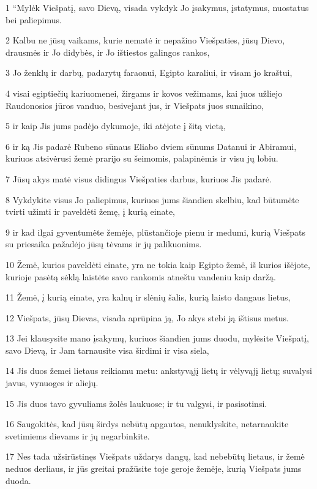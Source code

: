 \par 1 “Mylėk Viešpatį, savo Dievą, visada vykdyk Jo įsakymus, įstatymus, nuostatus bei paliepimus. 
\par 2 Kalbu ne jūsų vaikams, kurie nematė ir nepažino Viešpaties, jūsų Dievo, drausmės ir Jo didybės, ir Jo ištiestos galingos rankos, 
\par 3 Jo ženklų ir darbų, padarytų faraonui, Egipto karaliui, ir visam jo kraštui, 
\par 4 visai egiptiečių kariuomenei, žirgams ir kovos vežimams, kai juos užliejo Raudonosios jūros vanduo, besivejant jus, ir Viešpats juos sunaikino, 
\par 5 ir kaip Jis jums padėjo dykumoje, iki atėjote į šitą vietą, 
\par 6 ir ką Jis padarė Rubeno sūnaus Eliabo dviem sūnums Datanui ir Abiramui, kuriuos atsivėrusi žemė prarijo su šeimomis, palapinėmis ir visu jų lobiu. 
\par 7 Jūsų akys matė visus didingus Viešpaties darbus, kuriuos Jis padarė. 
\par 8 Vykdykite visus Jo paliepimus, kuriuos jums šiandien skelbiu, kad būtumėte tvirti užimti ir paveldėti žemę, į kurią einate, 
\par 9 ir kad ilgai gyventumėte žemėje, plūstančioje pienu ir medumi, kurią Viešpats su priesaika pažadėjo jūsų tėvams ir jų palikuonims. 
\par 10 Žemė, kurios paveldėti einate, yra ne tokia kaip Egipto žemė, iš kurios išėjote, kurioje pasėtą sėklą laistėte savo rankomis atneštu vandeniu kaip daržą. 
\par 11 Žemė, į kurią einate, yra kalnų ir slėnių šalis, kurią laisto dangaus lietus, 
\par 12 Viešpats, jūsų Dievas, visada aprūpina ją, Jo akys stebi ją ištisus metus. 
\par 13 Jei klausysite mano įsakymų, kuriuos šiandien jums duodu, mylėsite Viešpatį, savo Dievą, ir Jam tarnausite visa širdimi ir visa siela, 
\par 14 Jis duos žemei lietaus reikiamu metu: ankstyvąjį lietų ir vėlyvąjį lietų; suvalysi javus, vynuoges ir aliejų. 
\par 15 Jis duos tavo gyvuliams žolės laukuose; ir tu valgysi, ir pasisotinsi. 
\par 16 Saugokitės, kad jūsų širdys nebūtų apgautos, nenuklyskite, netarnaukite svetimiems dievams ir jų negarbinkite. 
\par 17 Nes tada užsirūstinęs Viešpats uždarys dangų, kad nebebūtų lietaus, ir žemė neduos derliaus, ir jūs greitai pražūsite toje geroje žemėje, kurią Viešpats jums duoda. 
